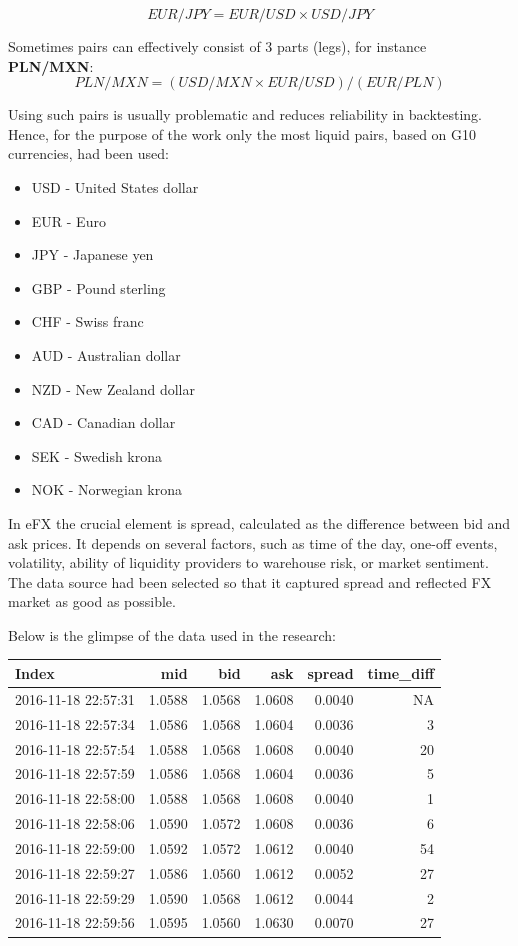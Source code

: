 \documentclass[]{article}
\providecommand{\tightlist}{%
  \setlength{\itemsep}{0pt}\setlength{\parskip}{0pt}}
\begin{document}
\[EUR/JPY = EUR/USD\times USD/JPY\]

Sometimes pairs can effectively consist of 3 parts (legs), for instance
\textbf{PLN/MXN}: \[PLN/MXN = (USD/MXN\times EUR/USD)/(EUR/PLN)\]

Using such pairs is usually problematic and reduces reliability in
backtesting. Hence, for the purpose of the work only the most liquid
pairs, based on G10 currencies, had been used:

\begin{itemize}
\tightlist
\item
  USD - United States dollar
\item
  EUR - Euro
\item
  JPY - Japanese yen
\item
  GBP - Pound sterling
\item
  CHF - Swiss franc
\item
  AUD - Australian dollar
\item
  NZD - New Zealand dollar
\item
  CAD - Canadian dollar
\item
  SEK - Swedish krona
\item
  NOK - Norwegian krona
\end{itemize}

In eFX the crucial element is spread, calculated as the difference
between bid and ask prices. It depends on several factors, such as time
of the day, one-off events, volatility, ability of liquidity providers
to warehouse risk, or market sentiment. The data source had been
selected so that it captured spread and reflected FX market as good as
possible.

Below is the glimpse of the data used in the research:

\begin{longtable}[]{@{}lrrrrr@{}}
\toprule
Index & mid & bid & ask & spread & time\_diff\tabularnewline
\midrule
\endhead
2016-11-18 22:57:31 & 1.0588 & 1.0568 & 1.0608 & 0.0040 &
NA\tabularnewline
2016-11-18 22:57:34 & 1.0586 & 1.0568 & 1.0604 & 0.0036 &
3\tabularnewline
2016-11-18 22:57:54 & 1.0588 & 1.0568 & 1.0608 & 0.0040 &
20\tabularnewline
2016-11-18 22:57:59 & 1.0586 & 1.0568 & 1.0604 & 0.0036 &
5\tabularnewline
2016-11-18 22:58:00 & 1.0588 & 1.0568 & 1.0608 & 0.0040 &
1\tabularnewline
2016-11-18 22:58:06 & 1.0590 & 1.0572 & 1.0608 & 0.0036 &
6\tabularnewline
2016-11-18 22:59:00 & 1.0592 & 1.0572 & 1.0612 & 0.0040 &
54\tabularnewline
2016-11-18 22:59:27 & 1.0586 & 1.0560 & 1.0612 & 0.0052 &
27\tabularnewline
2016-11-18 22:59:29 & 1.0590 & 1.0568 & 1.0612 & 0.0044 &
2\tabularnewline
2016-11-18 22:59:56 & 1.0595 & 1.0560 & 1.0630 & 0.0070 &
27\tabularnewline
\bottomrule
\end{longtable}
\end{document}
